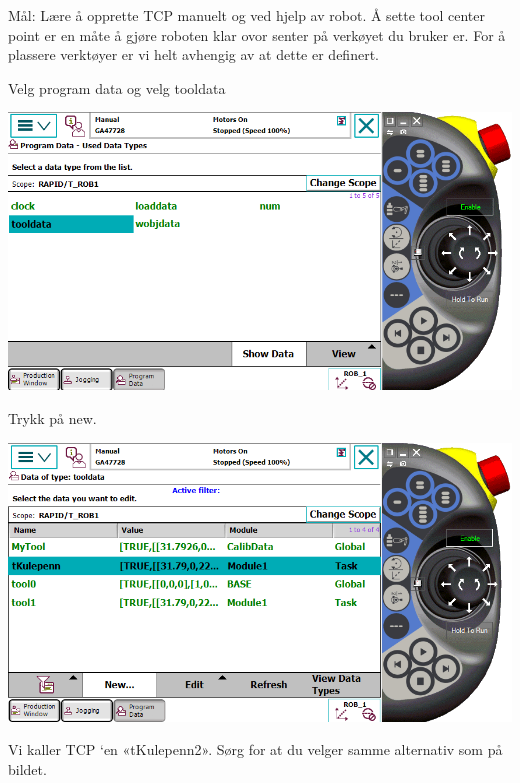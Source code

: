 Mål: Lære å opprette TCP manuelt og ved hjelp av robot.
\vskip 5pt 
Å sette tool center point er en måte å gjøre roboten klar  ovor senter på verkøyet du bruker er. For å plassere verktøyer er vi helt avhengig av at dette er definert. 

\vspace{1cm}

Velg program data og velg tooldata

\vspace{1cm}

\includegraphics[width=1\textwidth]{i04861x06}

\vspace{1cm}

Trykk på new.

\vspace{1cm}

\includegraphics[width=1\textwidth]{i04861x07}

\vspace{1cm}

Vi kaller TCP \textquoteleft en «tKulepenn2». Sørg for at du velger
samme alternativ som på bildet.

